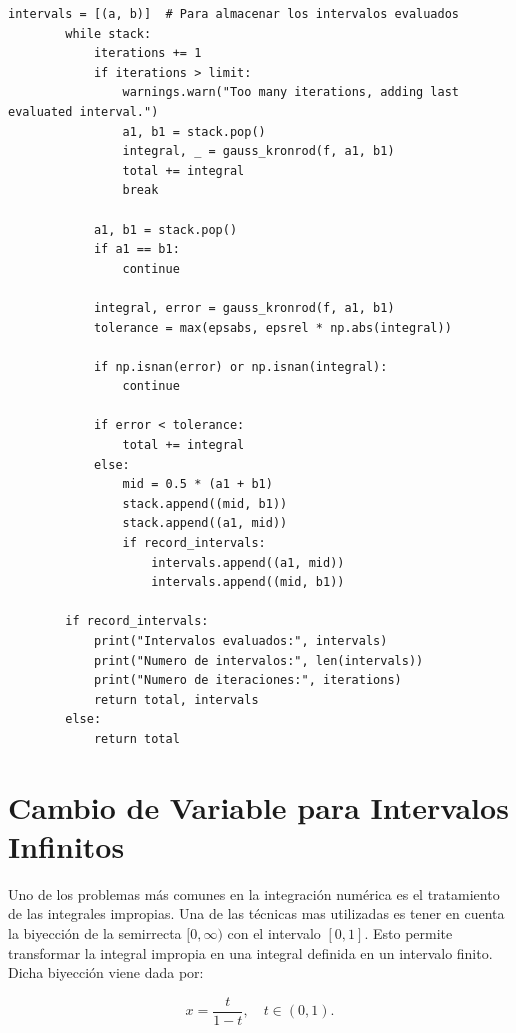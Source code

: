 \documentclass{article}
\begin{document}
\begin{lstlisting}[caption={Implementación de la integración adaptativa con cuadratura Gauss-Kronrod}]
        intervals = [(a, b)]  # Para almacenar los intervalos evaluados
        while stack:
            iterations += 1
            if iterations > limit:
                warnings.warn("Too many iterations, adding last evaluated interval.")
                a1, b1 = stack.pop()
                integral, _ = gauss_kronrod(f, a1, b1)
                total += integral
                break
    
            a1, b1 = stack.pop()
            if a1 == b1:
                continue
    
            integral, error = gauss_kronrod(f, a1, b1)
            tolerance = max(epsabs, epsrel * np.abs(integral))
    
            if np.isnan(error) or np.isnan(integral):
                continue
    
            if error < tolerance:
                total += integral
            else:
                mid = 0.5 * (a1 + b1)
                stack.append((mid, b1))
                stack.append((a1, mid))
                if record_intervals:
                    intervals.append((a1, mid))
                    intervals.append((mid, b1))
    
        if record_intervals:
            print("Intervalos evaluados:", intervals)
            print("Numero de intervalos:", len(intervals))
            print("Numero de iteraciones:", iterations)
            return total, intervals
        else:
            return total
    \end{lstlisting}



\section{Cambio de Variable para Intervalos Infinitos}
Uno de los problemas más comunes en la integración numérica es el tratamiento de las integrales impropias. Una de las técnicas mas utilizadas es tener en cuenta la biyección de la semirrecta $[0, \infty)$ con el intervalo $[0, 1]$. Esto permite transformar la integral impropia en una integral definida en un intervalo finito. Dicha biyección viene dada por:

\begin{equation}
    x = \frac{t}{1-t}, \quad t \in (0,1).
    \label{eq:biyeccion}
\end{equation}
    
\end{document}

